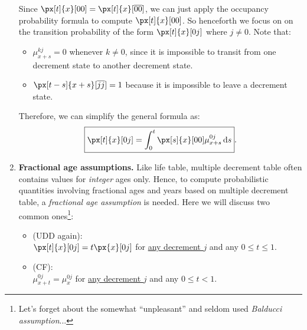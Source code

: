 \begin{enumerate}
Since \(\px[t]{x}[00]=\px[t]{x}[\overline{00}]\), we can just apply the
occupancy probability formula to compute \(\px[t]{x}[00]\). So henceforth we
focus on on the transition probability of the form \(\px[t]{x}[0j]\) where
\(j\ne 0\). Note that:
\begin{itemize}
\item \(\mu_{x+s}^{kj}=0\) whenever \(k\ne 0\), since it is impossible to
transit from one decrement state to another decrement state.
\item \(\px[t-s]{x+s}[\overline{jj}]=1\) because it is impossible to leave a
decrement state.
\end{itemize}
Therefore, we can simplify the general formula as:
\[
\boxed{\px[t]{x}[0j]=\int_{0}^{t}\px[s]{x}[00]\mu_{x+s}^{0j}\dd{s}}.
\]
\item \textbf{Fractional age assumptions.} Like life table, multiple decrement
table often contains values for \emph{integer} ages only. Hence, to compute
probabilistic quantities involving fractional ages and years based on multiple
decrement table, a \emph{fractional age assumption} is needed. Here we will
discuss two common ones\footnote{Let's forget about the somewhat ``unpleasant''
and seldom used \emph{Balducci
assumption}...}:
\begin{itemize}
\item {} (UDD again): \\
\(\px[t]{x}[0j]=t\px{x}[0j]\) for \underline{any decrement \(j\)} and any \(0\le t\le 1\).
\item {} (CF): \\
\(\mu_{x+t}^{0j}=\mu_{x}^{0j}\) for \underline{any decrement \(j\)} and any
\(0\le t<1\).
\end{itemize}


\end{enumerate}
